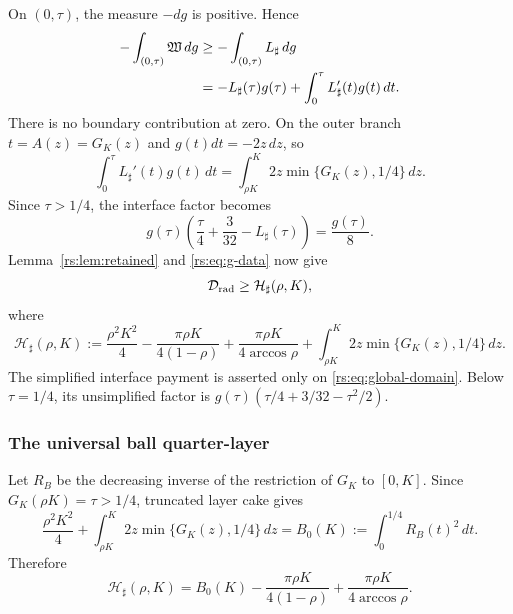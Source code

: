 \documentclass[11pt]{article}
\theoremstyle{remark}
\begin{document}
On $(0,\tau)$, the measure $-dg$ is positive.  Hence
\begin{align}
 -\int_{(0,\tau)}\mathfrak W\,dg
 &\geq -\int_{(0,\tau)}L_\sharp\,dg \notag\\
 &=-L_\sharp(\tau)g(\tau)
   +\int_0^\tau L_\sharp'(t)g(t)\,dt.
 \label{rs:eq:R-sharp-parts}
\end{align}
There is no boundary contribution at zero.  On the outer branch
$t=A(z)=G_K(z)$ and $g(t)dt=-2z\,dz$, so
\begin{equation}
 \int_0^\tau L_\sharp'(t)g(t)\,dt
 =\int_{\rho K}^K2z\min\{G_K(z),1/4\}\,dz.
 \label{rs:eq:R-sharp-action}
\end{equation}
Since $\tau>1/4$, the interface factor becomes
\[
 g(\tau)\left(\frac\tau4+\frac3{32}-L_\sharp(\tau)\right)
 =\frac{g(\tau)}8.
\]
Lemma~\ref{rs:lem:retained} and \eqref{rs:eq:g-data} now give
\begin{equation}
 \mathcal D_{\rm rad}\geq\mathcal H_\sharp(\rho,K),
 \label{rs:eq:H-sharp-bound}
\end{equation}
where
\begin{equation}
 \mathcal H_\sharp(\rho,K):=
 \frac{\rho^2K^2}{4}
 -\frac{\pi\rho K}{4(1-\rho)}
 +\frac{\pi\rho K}{4\arccos\rho}
 +\int_{\rho K}^K2z\min\{G_K(z),1/4\}\,dz.
 \label{rs:eq:H-sharp}
\end{equation}
The simplified interface payment is asserted only on
\eqref{rs:eq:global-domain}.  Below $\tau=1/4$, its unsimplified factor is
$g(\tau)(\tau/4+3/32-\tau^2/2)$.

\subsubsection*{The universal ball quarter-layer}

Let $R_B$ be the decreasing inverse of the restriction of $G_K$ to
$[0,K]$.  Since
$G_K(\rho K)=\tau>1/4$, truncated layer cake gives
\begin{equation}
 \frac{\rho^2K^2}{4}
 +\int_{\rho K}^K2z\min\{G_K(z),1/4\}\,dz
 =B_0(K):=\int_0^{1/4}R_B(t)^2\,dt.
 \label{rs:eq:ball-layer}
\end{equation}
Therefore
\begin{equation}
 \mathcal H_\sharp(\rho,K)
 =B_0(K)-\frac{\pi\rho K}{4(1-\rho)}
 +\frac{\pi\rho K}{4\arccos\rho}.
 \label{rs:eq:H-ball}
\end{equation}
\end{document}
